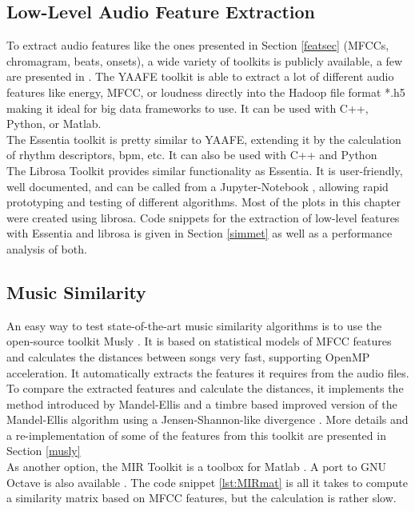 \subsection{Low-Level Audio Feature Extraction}
To extract audio features like the ones presented in Section \ref{featsec} (MFCCs, chromagram, beats, onsets), a wide variety of toolkits is publicly available, a few are presented in \cite{audiofeattoolb}.
The YAAFE toolkit \cite{yaafe1} is able to extract a lot of different audio features like energy, MFCC, or loudness directly into the Hadoop file format *.h5 making it ideal for big data frameworks to use. It can be used with C++, Python, or Matlab.\\
The Essentia toolkit \cite{essentia1} is pretty similar to YAAFE, extending it by the calculation of rhythm descriptors, bpm, etc. It can also be used with C++ and Python\\
The Librosa Toolkit provides similar functionality \cite{labrosa1} as Essentia. It is user-friendly, well documented, and can be called from a Jupyter-Notebook \cite{jupyter}, allowing rapid prototyping and testing of different algorithms. Most of the plots in this chapter were created using librosa. Code snippets for the extraction of low-level features with Essentia and librosa is given in Section \ref{simmet} as well as a performance analysis of both.\\

\subsection{Music Similarity}

An easy way to test state-of-the-art music similarity algorithms is to use the open-source toolkit Musly \cite{musly1}. It is based on statistical models of MFCC features and calculates the distances between songs very fast, supporting OpenMP acceleration. It automatically extracts the features it requires from the audio files. To compare the extracted features and calculate the distances, it implements the method introduced by Mandel-Ellis \cite{mandelellis1} and a timbre based improved version of the Mandel-Ellis algorithm using a Jensen-Shannon-like divergence \cite{musly2}. More details and a re-implementation of some of the features from this toolkit are presented in Section \ref{musly}\\
As another option, the MIR Toolkit \cite{mirtoolbox1} is a toolbox for Matlab \cite{matl1}. A port to GNU Octave \cite{octave1} is also available \cite{mirtoolbox2}. The code snippet \ref{lst:MIRmat} is all it takes to compute a similarity matrix based on MFCC features, but the calculation is rather slow.


